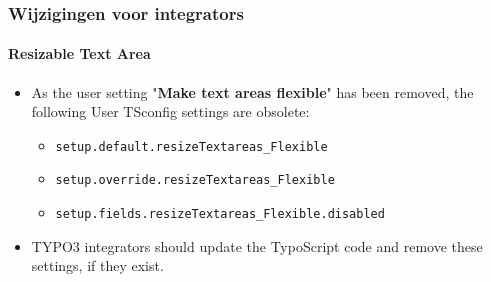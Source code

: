 %

\begin{frame}[fragile]
	\frametitle{Wijzigingen voor integrators}
	\framesubtitle{Resizable Text Area}

	\begin{itemize}
		\item As the user setting "\textbf{Make text areas flexible}" has been removed,
			the following User TSconfig settings are obsolete:

			\begin{itemize}
				\item \texttt{setup.default.resizeTextareas\_Flexible}
				\item \texttt{setup.override.resizeTextareas\_Flexible}
				\item \texttt{setup.fields.resizeTextareas\_Flexible.disabled}
			\end{itemize}

		\item TYPO3 integrators should update the TypoScript code and remove these
			settings, if they exist.

	\end{itemize}
\end{frame}

